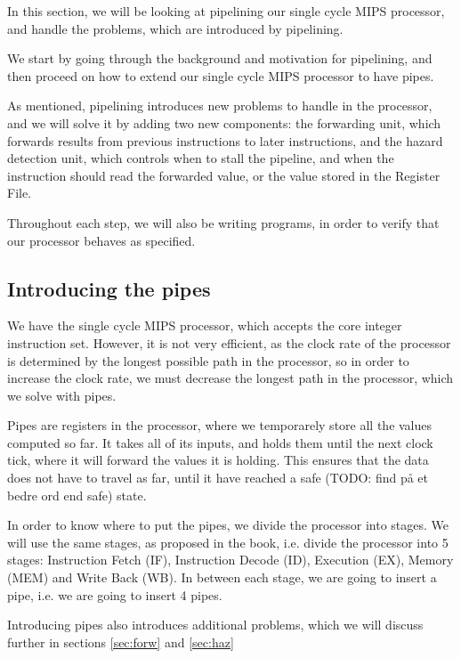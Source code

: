 In this section, we will be looking at pipelining our single cycle MIPS
processor, and handle the problems, which are introduced by pipelining.

We start by going through the background and motivation for pipelining, and
then proceed on how to extend our single cycle MIPS processor to have pipes.

As mentioned, pipelining introduces new problems to handle in the processor,
and we will solve it by adding two new components: the forwarding unit, which
forwards results from previous instructions to later instructions, and the
hazard detection unit, which controls when to stall the pipeline, and when the
instruction should read the forwarded value, or the value stored in the
Register File.

Throughout each step, we will also be writing programs, in order to verify that
our processor behaves as specified.

\subsection{Introducing the pipes}
We have the single cycle MIPS processor, which accepts the core integer
instruction set. However, it is not very efficient, as the clock rate of the
processor is determined by the longest possible path in the processor, so in
order to increase the clock rate, we must decrease the longest path in the
processor, which we solve with pipes.

Pipes are registers in the processor, where we temporarely store all the values
computed so far. It takes all of its inputs, and holds them until the next
clock tick, where it will forward the values it is holding. This ensures that
the data does not have to travel as far, until it have reached a safe (TODO:
find på et bedre ord end safe) state.

In order to know where to put the pipes, we divide the processor into stages.
We will use the same stages, as proposed in the book\cite{ref:ark}, i.e. divide
the processor into 5 stages: Instruction Fetch (IF), Instruction Decode (ID),
Execution (EX), Memory (MEM) and Write Back (WB). In between each stage, we are
going to insert a pipe, i.e. we are going to insert 4 pipes.

Introducing pipes also introduces additional problems, which we will discuss
further in sections \ref{sec:forw} and \ref{sec:haz}

